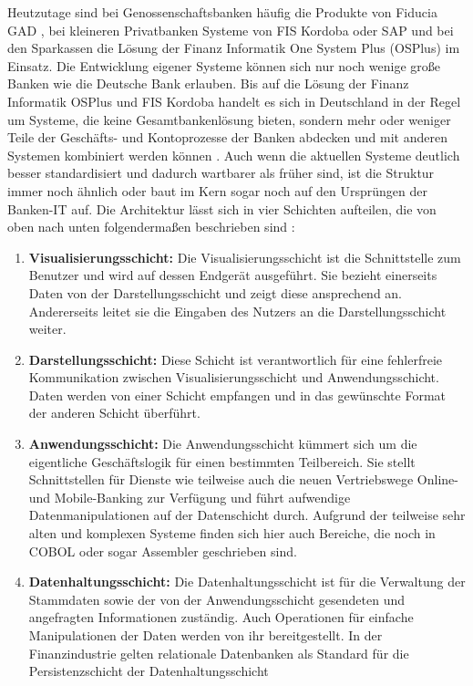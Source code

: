 \documentclass[12pt,oneside,a4paper,parskip]{scrbook}
\begin{document}
Heutzutage sind bei Genossenschaftsbanken häufig die Produkte von Fiducia GAD \cite{fiducia}, bei kleineren Privatbanken Systeme von FIS Kordoba \cite{kordoba} oder SAP \cite{SAP} und bei den Sparkassen die Lösung der Finanz Informatik One System Plus (OSPlus) \cite{finanzinformatik} im Einsatz. Die Entwicklung eigener Systeme können sich nur noch wenige große Banken wie die Deutsche Bank erlauben. Bis auf die Lösung der Finanz Informatik OSPlus und FIS Kordoba handelt es sich in Deutschland in der Regel um Systeme, die keine Gesamtbankenlösung bieten, sondern mehr oder weniger Teile der Geschäfts- und Kontoprozesse der Banken abdecken und mit anderen Systemen kombiniert werden können \cite{einfuehrungKernbanksystem}\cite[56-58]{ITidF}. Auch wenn die aktuellen Systeme deutlich besser standardisiert und dadurch wartbarer als früher sind, ist die Struktur immer noch ähnlich oder baut im Kern sogar noch auf den Ursprüngen der Banken-IT auf. Die Architektur lässt sich in vier Schichten aufteilen, die von oben nach unten folgendermaßen beschrieben sind \cite[104]{ITidF}:

\begin{enumerate}
\item \textbf{Visualisierungsschicht:} Die Visualisierungsschicht ist die Schnittstelle zum Benutzer und wird auf dessen Endgerät ausgeführt. Sie bezieht einerseits Daten von der Darstellungsschicht und zeigt diese ansprechend an. Andererseits leitet sie die Eingaben des Nutzers an die Darstellungsschicht weiter.
\item \textbf{Darstellungsschicht:} Diese Schicht ist verantwortlich für eine fehlerfreie Kommunikation zwischen Visualisierungsschicht und Anwendungsschicht. Daten werden von einer Schicht empfangen und in das gewünschte Format der anderen Schicht überführt.
\item \textbf{Anwendungsschicht:} Die Anwendungsschicht kümmert sich um die eigentliche Geschäftslogik für einen bestimmten Teilbereich. Sie stellt Schnittstellen für Dienste wie teilweise auch die neuen Vertriebswege Online- und Mobile-Banking zur Verfügung und führt aufwendige Datenmanipulationen auf der Datenschicht durch. Aufgrund der teilweise sehr alten und komplexen Systeme finden sich hier auch Bereiche, die noch in COBOL oder sogar Assembler geschrieben sind.
\item \textbf{Datenhaltungsschicht:} Die Datenhaltungsschicht ist für die Verwaltung der Stammdaten sowie der von der Anwendungsschicht gesendeten und angefragten Informationen zuständig. Auch Operationen für einfache Manipulationen der Daten werden von ihr bereitgestellt. In der Finanzindustrie gelten relationale Datenbanken als Standard für die Persistenzschicht der Datenhaltungsschicht \cite[105]{ITidF}\cite{MarkstudieKernbankensysteme}
\end{enumerate}
\end{document}

